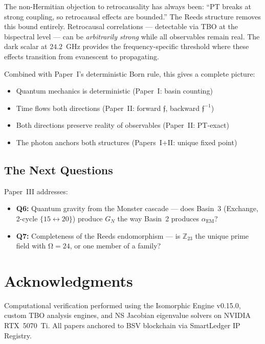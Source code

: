 \documentclass[12pt,a4paper]{article}
\theoremstyle{definition}
\theoremstyle{remark}
\renewcommand{\O}{\mathrm{\Omega}}
\newcommand{\Reeds}{\mathfrak{f}}
\newcommand{\Zp}{\mathbb{Z}_{23}}
\begin{document}
The non-Hermitian objection to retrocausality has always been: ``PT breaks at
strong coupling, so retrocausal effects are bounded.'' The Reeds structure
removes this bound entirely. Retrocausal correlations --- detectable via TBO
at the bispectral level --- can be \emph{arbitrarily strong} while all
observables remain real. The dark scalar at $24.2$~GHz provides the
frequency-specific threshold where these effects transition from evanescent
to propagating.

Combined with Paper~I's deterministic Born rule, this gives a complete picture:
\begin{itemize}
  \item Quantum mechanics is deterministic (Paper~I: basin counting)
  \item Time flows both directions (Paper~II: forward $\Reeds$, backward
  $\Reeds^{-1}$)
  \item Both directions preserve reality of observables (Paper~II: PT-exact)
  \item The photon anchors both structures (Papers~I+II: unique fixed point)
\end{itemize}

\subsection{The Next Questions}

Paper~III addresses:
\begin{itemize}
  \item \textbf{Q6:} Quantum gravity from the Monster cascade --- does Basin~3
  (Exchange, 2-cycle $\{15 \leftrightarrow 20\}$) produce $G_N$ the way Basin~2
  produces $\alpha_{\mathrm{EM}}$?
  \item \textbf{Q7:} Completeness of the Reeds endomorphism --- is $\Zp$ the
  unique prime field with $\O = 24$, or one member of a family?
\end{itemize}

\section*{Acknowledgments}

Computational verification performed using the Isomorphic Engine v0.15.0,
custom TBO analysis engines, and NS Jacobian eigenvalue solvers on NVIDIA
RTX~5070~Ti. All papers anchored to BSV blockchain via SmartLedger IP Registry.
\end{document}

